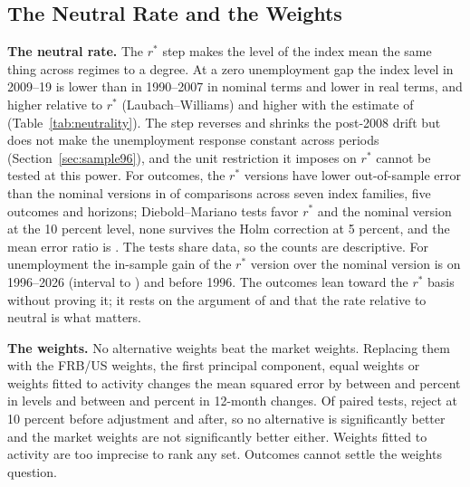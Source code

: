 \documentclass[11pt]{article}
\newcommand{\rs}{r^{*}}
\begin{document}


\subsection{The Neutral Rate and the Weights}\label{sec:rstarweights}
\textbf{The neutral rate.} The $\rs$ step makes the level of the index mean the same thing across regimes to a degree. At a zero unemployment gap the index level in 2009--19 is  lower than in 1990--2007 in nominal terms and  lower in real terms, and  higher relative to $\rs$ (Laubach--Williams) and  higher with the estimate of \citet{kiley2020} (Table~\ref{tab:neutrality}). The step reverses and shrinks the post-2008 drift but does not make the unemployment response constant across periods (Section~\ref{sec:sample96}), and the unit restriction it imposes on $\rs$ cannot be tested at this power. For outcomes, the $\rs$ versions have lower out-of-sample error than the nominal versions in  of  comparisons across seven index families, five outcomes and horizons;  Diebold--Mariano tests favor $\rs$ and  the nominal version at the 10 percent level, none survives the Holm correction at 5 percent, and the mean error ratio is . The tests share data, so the counts are descriptive. For unemployment the in-sample gain of the $\rs$ version over the nominal version is  on 1996--2026 (interval  to ) and  before 1996. The outcomes lean toward the $\rs$ basis without proving it; it rests on the argument of \citet{dudley2010} and \citet{caballero2026} that the rate relative to neutral is what matters.



\textbf{The weights.} No alternative weights beat the market weights. Replacing them with the FRB/US weights, the first principal component, equal weights or weights fitted to activity changes the mean squared error by between  and  percent in levels and between  and  percent in 12-month changes. Of  paired tests,  reject at 10 percent before adjustment and  after, so no alternative is significantly better and the market weights are not significantly better either. Weights fitted to activity are too imprecise to rank any set. Outcomes cannot settle the weights question.
\FloatBarrier
\end{document}
